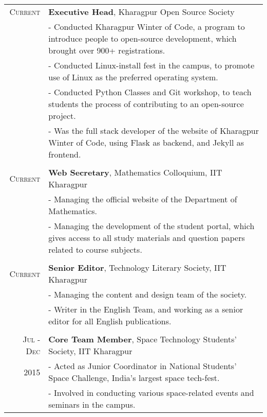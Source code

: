 \documentclass[a4paper,10pt]{extarticle} %
\begin{document}
\begin{tabular}{r|p{18cm}}
\textsc{Current} & \textbf{Executive Head}, Kharagpur Open Source Society
\vspace{1mm} \\
& \footnotesize{- Conducted Kharagpur Winter of Code, a program to introduce people to open-source development, which brought over 900+ registrations.}\\
& \footnotesize{- Conducted Linux-install fest in the campus, to promote use of Linux as the preferred operating system.}\\
& \footnotesize{- Conducted Python Classes and Git workshop, to teach students the process of contributing to an open-source project.}\\
& \footnotesize{- Was the full stack developer of the website of Kharagpur Winter of Code, using Flask as backend, and Jekyll as frontend.}\\
\\
\textsc{Current} & \textbf{Web Secretary}, Mathematics Colloquium, IIT Kharagpur
\vspace{1mm} \\
& \footnotesize{- Managing the official website of the Department of Mathematics.}\\
& \footnotesize{- Managing the development of the student portal, which gives access to all study materials and question papers related to course subjects.}\\
\\
\textsc{Current} & \textbf{Senior Editor}, Technology Literary Society, IIT Kharagpur 
\vspace{1mm} \\
& \footnotesize{- Managing the content and design team of the society.}\\
& \footnotesize{- Writer in the English Team, and working as a senior editor for all English publications.}\\
\\
\textsc{Jul - Dec} & \textbf{Core Team Member}, Space Technology Students' Society, IIT Kharagpur
\vspace{1mm} \\
\textsc{2015}& \footnotesize{- Acted as Junior Coordinator in National Students' Space Challenge, India's largest space tech-fest.}\\
& \footnotesize{- Involved in conducting various space-related events and seminars in the campus.}\\
\end{tabular}
\end{document}
